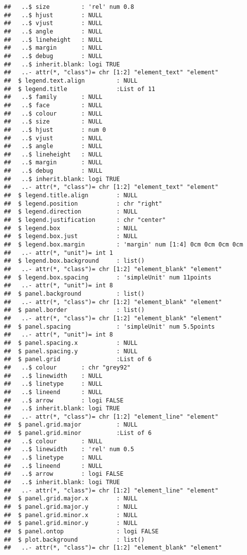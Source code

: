 \documentclass[
]{article}
\begin{document}
\begin{verbatim}
##   ..$ size         : 'rel' num 0.8
##   ..$ hjust        : NULL
##   ..$ vjust        : NULL
##   ..$ angle        : NULL
##   ..$ lineheight   : NULL
##   ..$ margin       : NULL
##   ..$ debug        : NULL
##   ..$ inherit.blank: logi TRUE
##   ..- attr(*, "class")= chr [1:2] "element_text" "element"
##  $ legend.text.align         : NULL
##  $ legend.title              :List of 11
##   ..$ family       : NULL
##   ..$ face         : NULL
##   ..$ colour       : NULL
##   ..$ size         : NULL
##   ..$ hjust        : num 0
##   ..$ vjust        : NULL
##   ..$ angle        : NULL
##   ..$ lineheight   : NULL
##   ..$ margin       : NULL
##   ..$ debug        : NULL
##   ..$ inherit.blank: logi TRUE
##   ..- attr(*, "class")= chr [1:2] "element_text" "element"
##  $ legend.title.align        : NULL
##  $ legend.position           : chr "right"
##  $ legend.direction          : NULL
##  $ legend.justification      : chr "center"
##  $ legend.box                : NULL
##  $ legend.box.just           : NULL
##  $ legend.box.margin         : 'margin' num [1:4] 0cm 0cm 0cm 0cm
##   ..- attr(*, "unit")= int 1
##  $ legend.box.background     : list()
##   ..- attr(*, "class")= chr [1:2] "element_blank" "element"
##  $ legend.box.spacing        : 'simpleUnit' num 11points
##   ..- attr(*, "unit")= int 8
##  $ panel.background          : list()
##   ..- attr(*, "class")= chr [1:2] "element_blank" "element"
##  $ panel.border              : list()
##   ..- attr(*, "class")= chr [1:2] "element_blank" "element"
##  $ panel.spacing             : 'simpleUnit' num 5.5points
##   ..- attr(*, "unit")= int 8
##  $ panel.spacing.x           : NULL
##  $ panel.spacing.y           : NULL
##  $ panel.grid                :List of 6
##   ..$ colour       : chr "grey92"
##   ..$ linewidth    : NULL
##   ..$ linetype     : NULL
##   ..$ lineend      : NULL
##   ..$ arrow        : logi FALSE
##   ..$ inherit.blank: logi TRUE
##   ..- attr(*, "class")= chr [1:2] "element_line" "element"
##  $ panel.grid.major          : NULL
##  $ panel.grid.minor          :List of 6
##   ..$ colour       : NULL
##   ..$ linewidth    : 'rel' num 0.5
##   ..$ linetype     : NULL
##   ..$ lineend      : NULL
##   ..$ arrow        : logi FALSE
##   ..$ inherit.blank: logi TRUE
##   ..- attr(*, "class")= chr [1:2] "element_line" "element"
##  $ panel.grid.major.x        : NULL
##  $ panel.grid.major.y        : NULL
##  $ panel.grid.minor.x        : NULL
##  $ panel.grid.minor.y        : NULL
##  $ panel.ontop               : logi FALSE
##  $ plot.background           : list()
##   ..- attr(*, "class")= chr [1:2] "element_blank" "element"

\end{verbatim}
\end{document}
